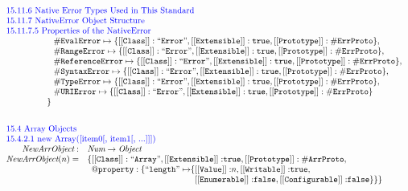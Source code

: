 \[
\begin{array}{rl}

\multicolumn{2}{l}{\mbox{\inblue 15.11.6 Native Error Types Used in This Standard}}\\
\multicolumn{2}{l}{\mbox{\inblue 15.11.7 NativeError Object Structure}}\\
\multicolumn{2}{l}{\mbox{\inblue 15.11.7.5 Properties of the NativeError}}\\
\multicolumn{2}{l}{\phantom{\emph{InitHeap} = \{}
{\tt\#EvalError} \mapsto \{{\tt [[Class]]: ``Error"}, {\tt [[Extensible]]: \true}, {\tt [[Prototype]]: \#ErrProto}
\},}\\%
\multicolumn{2}{l}{\phantom{\emph{InitHeap} = \{}
{\tt\#RangeError} \mapsto \{{\tt [[Class]]: ``Error"}, {\tt [[Extensible]]: \true}, {\tt [[Prototype]]: \#ErrProto}
\},}\\%
\multicolumn{2}{l}{\phantom{\emph{InitHeap} = \{}
{\tt\#ReferenceError} \mapsto \{{\tt [[Class]]: ``Error"}, {\tt [[Extensible]]: \true}, {\tt [[Prototype]]: \#ErrProto}
\},}\\%
\multicolumn{2}{l}{\phantom{\emph{InitHeap} = \{}
{\tt\#SyntaxError} \mapsto \{{\tt [[Class]]: ``Error"}, {\tt [[Extensible]]: \true}, {\tt [[Prototype]]: \#ErrProto}
\},}\\%
\multicolumn{2}{l}{\phantom{\emph{InitHeap} = \{}
{\tt\#TypeError} \mapsto \{{\tt [[Class]]: ``Error"}, {\tt [[Extensible]]: \true}, {\tt [[Prototype]]: \#ErrProto}
\},}\\%
\multicolumn{2}{l}{\phantom{\emph{InitHeap} = \{}
{\tt\#URIError} \mapsto \{{\tt [[Class]]: ``Error"}, {\tt [[Extensible]]: \true}, {\tt [[Prototype]]: \#ErrProto}
\}}\\%


\multicolumn{2}{l}{\phantom{\emph{InitHeap} = }
\}}
\\[2em]


\multicolumn{2}{l}{\mbox{\inblue 15.4 Array Objects}}\\
\multicolumn{2}{l}{\mbox{\inblue 15.4.2.1 new Array([item0[, item1[, ...]]])}}\\
\hf{NewArrObject} : & \Num \rightarrow \Obj\\
\hf{NewArrObject}(n)=&
 {\tt \{[[Class]]: ``Array"}, {\tt [[Extensible]]:} \true,%
{\tt [[Prototype]]: \#ArrProto},\\
& \phantom{\{}{\tt @property: \{``length"\mapsto}\{{\tt [[Value]]:}n,
 {\tt [[Writable]]:} \true,\\%
& \phantom{\{{\tt @property: \{``length"\mapsto}\{}%
 {\tt [[Enumerable]]:} \false,
 {\tt [[Configurable]]:} \false\}\}\}
\\[1em]



\end{array}\]
